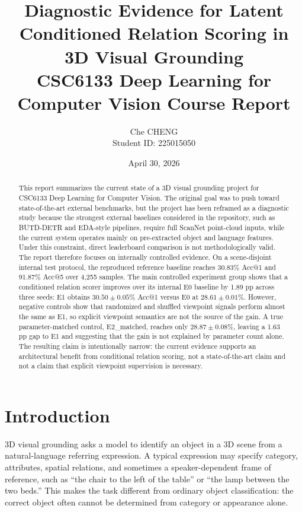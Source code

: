 \documentclass[11pt]{article}
\title{\textbf{Diagnostic Evidence for Latent Conditioned Relation Scoring in 3D Visual Grounding}\\
\large CSC6133 Deep Learning for Computer Vision Course Report}
\author{
Che CHENG\\
Student ID: 225015050
}
\date{April 30, 2026}
\makeatletter
\newcommand{\acc}{Acc@1}
\newcommand{\acctopfive}{Acc@5}
\newcommand{\pp}{pp}
\makeatother
\begin{document}
\maketitle

\begin{abstract}
This report summarizes the current state of a 3D visual grounding project for CSC6133 Deep Learning for Computer Vision. The original goal was to push toward state-of-the-art external benchmarks, but the project has been reframed as a diagnostic study because the strongest external baselines considered in the repository, such as BUTD-DETR and EDA-style pipelines, require full ScanNet point-cloud inputs, while the current system operates mainly on pre-extracted object and language features. Under this constraint, direct leaderboard comparison is not methodologically valid. The report therefore focuses on internally controlled evidence. On a scene-disjoint internal test protocol, the reproduced reference baseline reaches 30.83\% \acc{} and 91.87\% \acctopfive{} over 4,255 samples. The main controlled experiment group shows that a conditioned relation scorer improves over its internal E0 baseline by 1.89 \pp{} across three seeds: E1 obtains $30.50\pm0.05$\% \acc{} versus E0 at $28.61\pm0.01$\%. However, negative controls show that randomized and shuffled viewpoint signals perform almost the same as E1, so explicit viewpoint semantics are not the source of the gain. A true parameter-matched control, E2\_matched, reaches only $28.87\pm0.08$\%, leaving a 1.63 \pp{} gap to E1 and suggesting that the gain is not explained by parameter count alone. The resulting claim is intentionally narrow: the current evidence supports an architectural benefit from conditional relation scoring, not a state-of-the-art claim and not a claim that explicit viewpoint supervision is necessary.
\end{abstract}

\section{Introduction}

3D visual grounding asks a model to identify an object in a 3D scene from a natural-language referring expression. A typical expression may specify category, attributes, spatial relations, and sometimes a speaker-dependent frame of reference, such as ``the chair to the left of the table'' or ``the lamp between the two beds.'' This makes the task different from ordinary object classification: the correct object often cannot be determined from category or appearance alone.
\end{document}
